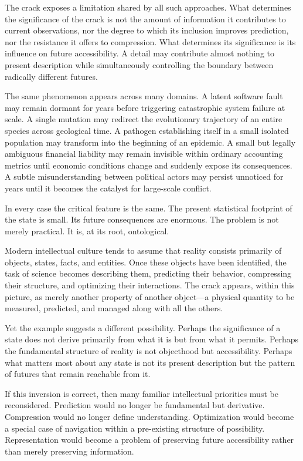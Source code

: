 \documentclass[12pt,a4paper]{article}
\theoremstyle{plain}
\theoremstyle{definition}
\theoremstyle{remark}
\begin{document}
The crack exposes a limitation shared by all such approaches. What
determines the significance of the crack is not the amount of information it
contributes to current observations, nor the degree to which its inclusion
improves prediction, nor the resistance it offers to compression. What
determines its significance is its influence on future accessibility. A
detail may contribute almost nothing to present description while
simultaneously controlling the boundary between radically different futures.

The same phenomenon appears across many domains. A latent software fault may
remain dormant for years before triggering catastrophic system failure at
scale. A single mutation may redirect the evolutionary trajectory of an
entire species across geological time. A pathogen establishing itself in a
small isolated population may transform into the beginning of an epidemic. A
small but legally ambiguous financial liability may remain invisible within
ordinary accounting metrics until economic conditions change and suddenly
expose its consequences. A subtle misunderstanding between political actors
may persist unnoticed for years until it becomes the catalyst for large-scale
conflict.

In every case the critical feature is the same. The present statistical
footprint of the state is small. Its future consequences are enormous. The
problem is not merely practical. It is, at its root, ontological.

Modern intellectual culture tends to assume that reality consists primarily
of objects, states, facts, and entities. Once these objects have been
identified, the task of science becomes describing them, predicting their
behavior, compressing their structure, and optimizing their interactions. The
crack appears, within this picture, as merely another property of another
object---a physical quantity to be measured, predicted, and managed along
with all the others.

Yet the example suggests a different possibility. Perhaps the significance of
a state does not derive primarily from what it is but from what it permits.
Perhaps the fundamental structure of reality is not objecthood but
accessibility. Perhaps what matters most about any state is not its present
description but the pattern of futures that remain reachable from it.

If this inversion is correct, then many familiar intellectual priorities must
be reconsidered. Prediction would no longer be fundamental but derivative.
Compression would no longer define understanding. Optimization would become
a special case of navigation within a pre-existing structure of possibility.
Representation would become a problem of preserving future accessibility
rather than merely preserving information.
\end{document}
